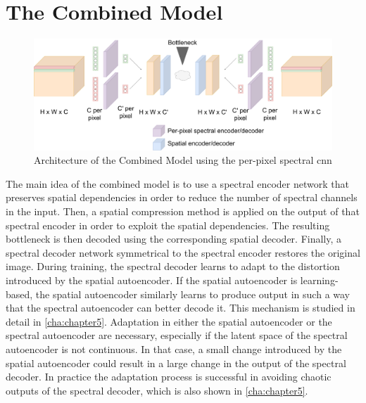 \section{The Combined Model\label{sec:combinedmodel}}
\begin{figure}
\centering
\includegraphics[scale=0.18]{img/GeneralArchitecture.pdf}
\caption[Combined model architecture]{Architecture of the Combined Model using the per-pixel spectral \ac{cnn}}
\label{fig:combined}
\end{figure}

The main idea of the combined model is to use a spectral encoder network that preserves spatial dependencies in order to reduce the number of spectral channels in the input. Then, a spatial compression method is applied on the output of that spectral encoder in order to exploit the spatial dependencies. The resulting bottleneck is then decoded using the corresponding spatial decoder. Finally, a spectral decoder network symmetrical to the spectral encoder restores the original image. During training, the spectral decoder learns to adapt to the distortion introduced by the spatial autoencoder. If the spatial autoencoder is learning-based, the spatial autoencoder similarly learns to produce output in such a way that the spectral autoencoder can better decode it. This mechanism is studied in detail in \autoref{cha:chapter5}. Adaptation in either the spatial autoencoder or the spectral autoencoder are necessary, especially if the latent space of the spectral autoencoder is not continuous. In that case, a small change introduced by the spatial autoencoder could result in a large change in the output of the spectral decoder. In practice the adaptation process is successful in avoiding chaotic outputs of the spectral decoder, which is also shown in \autoref{cha:chapter5}.

